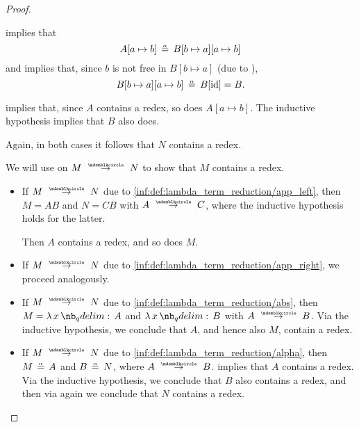 \begin{proof}
\begin{itemize}
\begin{itemize}
       implies that
      \begin{equation*}
        A[a \mapsto b] \aequiv B[b \mapsto a][a \mapsto b]
      \end{equation*}
      and  implies that, since \( b \) is not free in \( B[b \mapsto a] \) (due to ),
      \begin{equation*}
        B[b \mapsto a][a \mapsto b] \aequiv B[\id] = B.
      \end{equation*}

       implies that, since \( A \) contains a redex, so does \( A[a \mapsto b] \). The inductive hypothesis implies that \( B \) also does.
    \end{itemize}

    Again, in both cases it follows that \( N \) contains a redex.
  \end{itemize}


  \SufficiencySubProof* We will use  on \( M \pred N \) to show that \( M \) contains a redex.

  \begin{itemize}
    \item If \( M \pred N \) due to \ref{inf:def:lambda_term_reduction/app_left}, then \( M = AB \) and \( N = CB \) with \( A \pred C \), where the inductive hypothesis holds for the latter.

    Then \( A \) contains a redex, and so does \( M \).

    \item If \( M \pred N \) due to \ref{inf:def:lambda_term_reduction/app_right}, we proceed analogously.

    \item If \( M \pred N \) due to \ref{inf:def:lambda_term_reduction/abs}, then \( M = \qabs x A \) and \( \qabs x B  \) with \( A \pred B \). Via the inductive hypothesis, we conclude that \( A \), and hence also \( M \), contain a redex.

    \item If \( M \pred N \) due to \ref{inf:def:lambda_term_reduction/alpha}, then \( M \aequiv A \) and \( B \aequiv N \), where \( A \pred B \).  implies that \( A \) contains a redex. Via the inductive hypothesis, we conclude that \( B \) also contains a redex, and then via  again we conclude that \( N \) contains a redex.


\end{itemize}
\end{proof}
